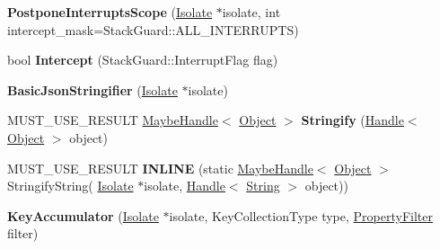 \begin{DoxyCompactItemize}
\item 
{\bfseries Postpone\+Interrupts\+Scope} (\hyperlink{classv8_1_1internal_1_1_isolate}{Isolate} $\ast$isolate, int intercept\+\_\+mask=Stack\+Guard\+::\+A\+L\+L\+\_\+\+I\+N\+T\+E\+R\+R\+U\+P\+TS)\hypertarget{classv8_1_1internal_1_1_b_a_s_e___e_m_b_e_d_d_e_d_a2500555cc1b06db7c13dabe81720e722}{}\label{classv8_1_1internal_1_1_b_a_s_e___e_m_b_e_d_d_e_d_a2500555cc1b06db7c13dabe81720e722}

\item 
bool {\bfseries Intercept} (Stack\+Guard\+::\+Interrupt\+Flag flag)\hypertarget{classv8_1_1internal_1_1_b_a_s_e___e_m_b_e_d_d_e_d_a128c2f54faffd098c3fa3f835096020f}{}\label{classv8_1_1internal_1_1_b_a_s_e___e_m_b_e_d_d_e_d_a128c2f54faffd098c3fa3f835096020f}

\item 
{\bfseries Basic\+Json\+Stringifier} (\hyperlink{classv8_1_1internal_1_1_isolate}{Isolate} $\ast$isolate)\hypertarget{classv8_1_1internal_1_1_b_a_s_e___e_m_b_e_d_d_e_d_a50d4b7d1aeca43793675986db350e377}{}\label{classv8_1_1internal_1_1_b_a_s_e___e_m_b_e_d_d_e_d_a50d4b7d1aeca43793675986db350e377}

\item 
M\+U\+S\+T\+\_\+\+U\+S\+E\+\_\+\+R\+E\+S\+U\+LT \hyperlink{classv8_1_1internal_1_1_maybe_handle}{Maybe\+Handle}$<$ \hyperlink{classv8_1_1internal_1_1_object}{Object} $>$ {\bfseries Stringify} (\hyperlink{classv8_1_1internal_1_1_handle}{Handle}$<$ \hyperlink{classv8_1_1internal_1_1_object}{Object} $>$ object)\hypertarget{classv8_1_1internal_1_1_b_a_s_e___e_m_b_e_d_d_e_d_a82d84029e3a9536462a6b3b03a1c206a}{}\label{classv8_1_1internal_1_1_b_a_s_e___e_m_b_e_d_d_e_d_a82d84029e3a9536462a6b3b03a1c206a}

\item 
M\+U\+S\+T\+\_\+\+U\+S\+E\+\_\+\+R\+E\+S\+U\+LT {\bfseries I\+N\+L\+I\+NE} (static \hyperlink{classv8_1_1internal_1_1_maybe_handle}{Maybe\+Handle}$<$ \hyperlink{classv8_1_1internal_1_1_object}{Object} $>$ Stringify\+String(               \hyperlink{classv8_1_1internal_1_1_isolate}{Isolate} $\ast$isolate,               \hyperlink{classv8_1_1internal_1_1_handle}{Handle}$<$ \hyperlink{classv8_1_1internal_1_1_string}{String} $>$ object))\hypertarget{classv8_1_1internal_1_1_b_a_s_e___e_m_b_e_d_d_e_d_ade580e8d87bbdfe3df89e5aa4b599242}{}\label{classv8_1_1internal_1_1_b_a_s_e___e_m_b_e_d_d_e_d_ade580e8d87bbdfe3df89e5aa4b599242}

\item 
{\bfseries Key\+Accumulator} (\hyperlink{classv8_1_1internal_1_1_isolate}{Isolate} $\ast$isolate, Key\+Collection\+Type type, \hyperlink{namespacev8_afbf02b6b1152a3e25d7bde90798209ac}{Property\+Filter} filter)\hypertarget{classv8_1_1internal_1_1_b_a_s_e___e_m_b_e_d_d_e_d_a0fe06fe00f50aa7a3336c24f1c115e7c}{}\label{classv8_1_1internal_1_1_b_a_s_e___e_m_b_e_d_d_e_d_a0fe06fe00f50aa7a3336c24f1c115e7c}


\end{DoxyCompactItemize}
